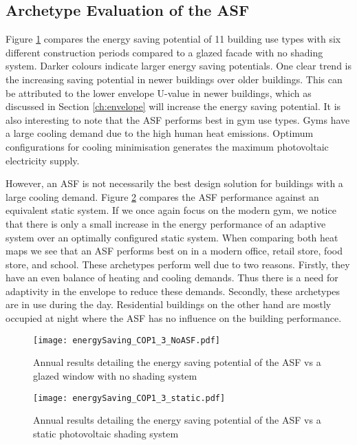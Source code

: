 \subsection{Archetype Evaluation of the ASF}

Figure \ref{fig:ArchResultsNoASF} compares the energy saving potential of 11 building use types with six different construction periods compared to a glazed facade with no shading system. Darker colours indicate larger energy saving potentials. One clear trend is the increasing saving potential in newer buildings over older buildings. This can be attributed to the lower envelope U-value in newer buildings, which as discussed in Section \ref{ch:envelope} will increase the energy saving potential. It is also interesting to note that the ASF performs best in gym use types. Gyms have a large cooling demand due to the high human heat emissions. Optimum configurations for cooling minimisation generates the maximum photovoltaic electricity supply. 


However, an ASF is not necessarily the best design solution for buildings with a large cooling demand. Figure \ref{fig:ArchResultsStatic} compares the ASF performance against an equivalent static system. If we once again focus on the modern gym, we notice that there is only a small increase in the energy performance of an adaptive system over an optimally configured static system. When comparing both heat maps we see that an ASF performs best on in a modern office, retail store, food store, and school. These archetypes perform well due to two reasons. Firstly, they have an even balance of heating and cooling demands. Thus there is a need for adaptivity in the envelope to reduce these demands. Secondly, these archetypes are in use during the day. Residential buildings on the other hand are mostly occupied at night where the ASF has no influence on the building performance.

\begin{figure}
\begin{center}
\texttt{[image: energySaving\_COP1\_3\_NoASF.pdf]}
\caption{Annual results detailing the energy saving potential of the ASF vs a glazed window with no shading system}
\label{fig:ArchResultsNoASF}
\end{center}
\end{figure}

\begin{figure}
\begin{center}
\texttt{[image: energySaving\_COP1\_3\_static.pdf]}
\caption{Annual results detailing the energy saving potential of the ASF vs a static photovoltaic shading system}
\label{fig:ArchResultsStatic}
\end{center}
\end{figure}